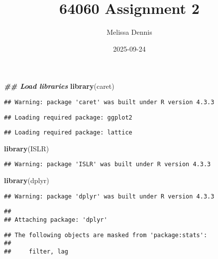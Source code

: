 \documentclass[
]{article}
\title{64060 Assignment 2}
\author{Melissa Dennis}
\date{2025-09-24}
\newenvironment{Shaded}{\begin{snugshade}}{\end{snugshade}}
\newcommand{\DocumentationTok}[1]{\textcolor[rgb]{0.56,0.35,0.01}{\textbf{\textit{#1}}}}
\newcommand{\FunctionTok}[1]{\textcolor[rgb]{0.13,0.29,0.53}{\textbf{#1}}}
\newcommand{\NormalTok}[1]{#1}
\begin{document}
\maketitle

\begin{Shaded}
\begin{Highlighting}[]
\DocumentationTok{\#\# Load libraries}
\FunctionTok{library}\NormalTok{(caret)}
\end{Highlighting}
\end{Shaded}

\begin{verbatim}
## Warning: package 'caret' was built under R version 4.3.3
\end{verbatim}

\begin{verbatim}
## Loading required package: ggplot2
\end{verbatim}

\begin{verbatim}
## Loading required package: lattice
\end{verbatim}

\begin{Shaded}
\begin{Highlighting}[]
\FunctionTok{library}\NormalTok{(ISLR)}
\end{Highlighting}
\end{Shaded}

\begin{verbatim}
## Warning: package 'ISLR' was built under R version 4.3.3
\end{verbatim}

\begin{Shaded}
\begin{Highlighting}[]
\FunctionTok{library}\NormalTok{(dplyr)}
\end{Highlighting}
\end{Shaded}

\begin{verbatim}
## Warning: package 'dplyr' was built under R version 4.3.3
\end{verbatim}

\begin{verbatim}
## 
## Attaching package: 'dplyr'
\end{verbatim}

\begin{verbatim}
## The following objects are masked from 'package:stats':
## 
##     filter, lag
\end{verbatim}
\end{document}

